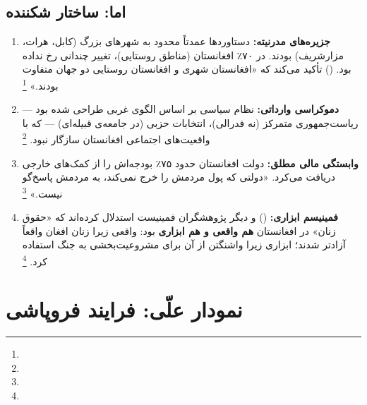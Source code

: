 \subsection{اما: ساختار شکننده}

\begin{tcolorbox}[defbox, title={چرا دستاوردها شکننده بودند؟}]
\begin{enumerate}[nosep, label=\textbf{\arabic*.}]
  \item \textbf{جزیره‌های مدرنیته:} دستاوردها عمدتاً محدود به شهرهای بزرگ (کابل، هرات، مزارشریف) بودند. در ۷۰٪ افغانستان (مناطق روستایی)، تغییر چندانی رخ نداده بود.  () تأکید می‌کند که «افغانستان شهری و افغانستان روستایی دو جهان متفاوت بودند.»%
  \footnote{}

  \item \textbf{دموکراسی وارداتی:} نظام سیاسی بر اساس الگوی غربی طراحی شده بود — ریاست‌جمهوری متمرکز (نه فدرالی)، انتخابات حزبی (در جامعه‌ی قبیله‌ای) — که با واقعیت‌های اجتماعی افغانستان سازگار نبود.%
  \footnote{}

  \item \textbf{وابستگی مالی مطلق:} دولت افغانستان حدود ۷۵٪ بودجه‌اش را از کمک‌های خارجی دریافت می‌کرد. «دولتی که پول مردمش را خرج نمی‌کند، به مردمش پاسخ‌گو نیست.»%
  \footnote{}

  \item \textbf{فمینیسم ابزاری:}  () و دیگر پژوهشگران فمینیست استدلال کرده‌اند که «حقوق زنان» در افغانستان \textbf{هم واقعی و هم ابزاری} بود: واقعی زیرا زنان افغان واقعاً آزادتر شدند؛ ابزاری زیرا واشنگتن از آن برای مشروعیت‌بخشی به جنگ استفاده کرد.%
  \footnote{}
\end{enumerate}
\end{tcolorbox}

\section{نمودار علّی: فرایند فروپاشی}
\label{sec:app-afg-causal}

